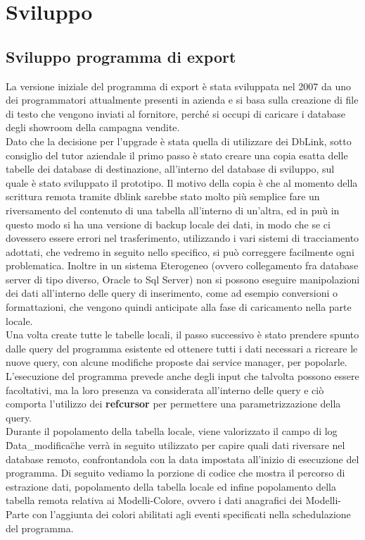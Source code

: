 \section{Sviluppo}
\subsection{Sviluppo programma di export}
La versione iniziale del programma di export è stata sviluppata nel 2007 da uno dei programmatori attualmente presenti in azienda e si basa sulla creazione di file di testo che vengono inviati al fornitore, perché si occupi di caricare i database degli showroom della campagna vendite.\\
Dato che la decisione per l'upgrade è stata quella di utilizzare dei DbLink, sotto consiglio del tutor aziendale il primo passo è stato creare una copia esatta delle tabelle dei database di destinazione, all'interno del database di sviluppo, sul quale è stato sviluppato il prototipo. Il motivo della copia è che al momento della scrittura remota tramite dblink sarebbe stato molto più semplice fare un riversamento del contenuto di una tabella all'interno di un'altra, ed in puù in questo modo si ha una versione di backup locale dei dati, in modo che se ci dovessero essere errori nel trasferimento, utilizzando i vari sistemi di tracciamento adottati, che vedremo in seguito nello specifico, si può correggere facilmente ogni problematica. Inoltre in un sistema Eterogeneo (ovvero collegamento fra database server di tipo diverso, Oracle to Sql Server) non si possono eseguire manipolazioni dei dati all'interno delle query di inserimento, come ad esempio conversioni o formattazioni, che vengono quindi anticipate alla fase di caricamento nella parte locale.\\
Una volta create tutte le tabelle locali, il passo successivo è stato prendere spunto dalle query del programma esistente ed ottenere tutti i dati necessari a ricreare le nuove query, con alcune modifiche proposte dai service manager, per popolarle. L'esecuzione del programma prevede anche degli input che talvolta possono essere facoltativi, ma la loro presenza va considerata all'interno delle query e ciò comporta l'utilizzo dei \textbf{refcursor} per permettere una parametrizzazione della query.\\
Durante il popolamento della tabella locale, viene valorizzato il campo di log \"Data\_modifica\" che verrà in seguito utilizzato per capire quali dati riversare nel database remoto, confrontandola con la data impostata all'inizio di esecuzione del programma.
Di seguito vediamo la porzione di codice che mostra il percorso di estrazione dati, popolamento della tabella locale ed infine popolamento della tabella remota relativa ai Modelli-Colore, ovvero i dati anagrafici dei Modelli-Parte con l'aggiunta dei colori abilitati agli eventi specificati nella schedulazione del programma.\\

